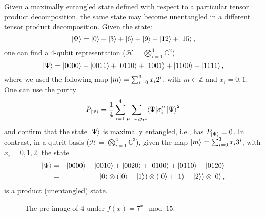 \documentclass[sigplan]{acmart}
\begin{document}
Given a maximally entangled state defined with respect to a particular
tensor product decomposition, the same state may become unentangled in
a different tensor product decomposition. Given the state:
\[
 \ket{\Psi} =\ket{0}+\ket{3}+\ket{6}+\ket{9}+\ket{12}+\ket{15},
\]
one can find a 4-qubit representation (${\mathcal H}=\bigotimes_{i=1}^4
\mathbb{C}^2$)
\[
 \ket{\Psi} = \ket{0000}+\ket{0011}+\ket{0110} 
  + \ket{1001}+\ket{1100}+\ket{1111},
\]
where we used the following map $\ket{m}=\sum_{i=0}^3 x_i 2^i$, with
$m \in \mathbb{Z}$ and $x_i=0,1$.  One can use the purity~\cite{GE2004}
\[
 P_{\ket{\Psi} }=\frac{1}{4}\sum_{i=1}^4\sum_{\mu=x,y,z}\langle \Psi |
 \sigma^\mu_i \ket{\Psi}^2
\]
and confirm that the state $\ket{\Psi}$ is maximally entangled, i.e.,
has $P_{\ket{\Psi}} =0$. In contrast, in a qutrit basis (${\mathcal
  H}=\bigotimes_{i=1}^4 \mathbb{C}^3$), given the map
$\ket{m}=\sum_{i=0}^3 x_i 3^i$, with $x_i=0,1,2$, the state
\begin{eqnarray}
 \ket{\Psi} &=&\ket{0000}+\ket{0010}+\ket{0020} 
  + \ket{0100}+\ket{0110}+\ket{0120} \nonumber \\
 &=&\ket{0}\otimes(\ket{0}+\ket{1})\otimes(\ket{0}+\ket{1}+\ket{2})\otimes\ket{0}, \nonumber
\end{eqnarray}
is a product (unentangled) state. 

\begin{figure}[ht]
\begin{center}
\end{center}
\caption{\label{fig:preimage}The pre-image of 4 under $f(x) = 7^x \mod 15$.}
\end{figure}
\end{document}
